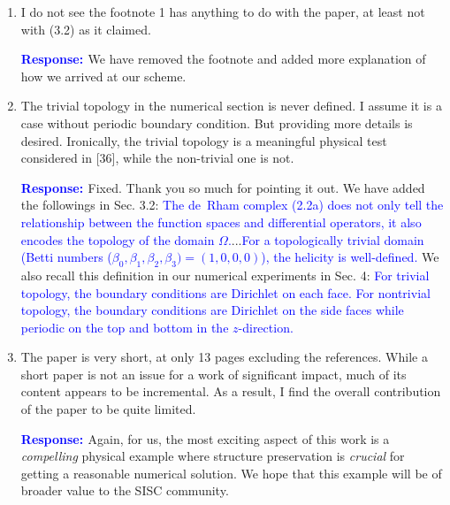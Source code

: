\documentclass{article}
\theoremstyle{definition}
\newcommand{\rv}[1]{%
  \colorbox{gray!20}{%
    \parbox{0.96\linewidth}{%
      \small #1
    }%
  }%
}
\newcommand{\rp}{\textbf{\textcolor{blue}{Response: }}}
\newcommand{\blue}[1]{\textcolor{blue}{#1}}
\begin{document}
\begin{enumerate}
\item \rv{I do not see the footnote 1 has anything to do with the paper, at least not with (3.2) as it claimed. }

\rp We have removed the footnote and added more explanation of how we arrived at our scheme. 

\item \rv{The trivial topology in the numerical section is never defined. I assume it is a case without periodic boundary condition. But providing more details is desired. Ironically, the trivial topology is a meaningful physical test considered in [36], while the non-trivial one is not. }

\rp Fixed. Thank you so much for pointing it out. We have added the followings in Sec. 3.2: \blue{The de~Rham complex (2.2a) does not only tell the relationship between the function spaces and differential operators, it also encodes the topology of the domain $\Omega$.}...\blue{For a topologically trivial domain (Betti numbers ($\beta_0, \beta_1, \beta_2, \beta_3) = (1, 0, 0, 0)$), the helicity is well-defined.} We also recall this definition in our numerical experiments in Sec. 4: \blue{For trivial topology, the boundary conditions are Dirichlet on each face. For nontrivial topology, the boundary conditions are Dirichlet on the side faces while periodic on the top and bottom in the $z$-direction.}

\item \rv{The paper is very short, at only 13 pages excluding the references. While a short paper is not an issue for a work of significant impact, much of its content appears to be incremental. As a result, I find the overall contribution of the paper to be quite limited.
}

\rp Again, for us, the most exciting aspect of this work is a \emph{compelling} physical example where structure preservation is \emph{crucial} for getting a reasonable numerical solution. We hope that this example will be of broader value to the SISC community.
\end{enumerate}

\clearpage


\end{document}
